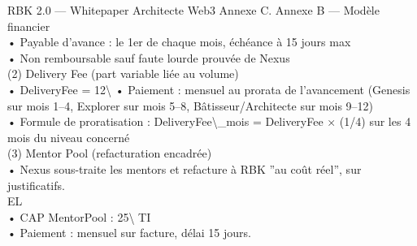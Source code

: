RBK 2.0 — Whitepaper Architecte Web3                                                                                    Annexe C. Annexe B — Modèle financier\\
\vspace{0.5em}
\vspace{0.5em}
• Payable d’avance : le 1er de chaque mois, échéance à 15 jours max\\
\vspace{0.5em}
• Non remboursable sauf faute lourde prouvée de Nexus\\
\vspace{0.5em}
(2) Delivery Fee (part variable liée au volume)\\
\vspace{0.5em}
• DeliveryFee = 12\textbackslash{}%
\vspace{0.5em}
• Paiement : mensuel au prorata de l’avancement (Genesis sur mois 1–4, Explorer sur mois 5–8, Bâtisseur/Architecte sur mois 9–12)\\
\vspace{0.5em}
• Formule de proratisation : DeliveryFee\textbackslash{}_mois = DeliveryFee × (1/4) sur les 4 mois du niveau concerné\\
\vspace{0.5em}
(3) Mentor Pool (refacturation encadrée)\\
\vspace{0.5em}
• Nexus sous-traite les mentors et refacture à RBK ”au coût réel”, sur justificatifs.\\
\vspace{0.5em}
\vspace{0.5em}
\vspace{0.5em}
\vspace{0.5em}
EL\\
• CAP MentorPool : 25\textbackslash{}%
\vspace{0.5em}
\vspace{0.5em}
\vspace{0.5em}
\vspace{0.5em}
TI\\
• Paiement : mensuel sur facture, délai 15 jours.\\
\vspace{0.5em}
\vspace{0.5em}
\vspace{0.5em}

